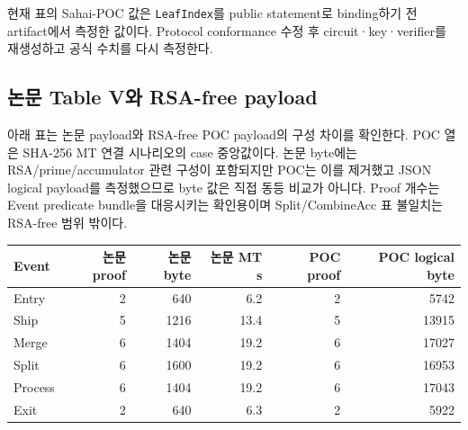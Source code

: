 \documentclass[10pt]{article}
\begin{document}
현재 표의 Sahai-POC 값은 \texttt{LeafIndex}를 public statement로 binding하기 전 artifact에서 측정한 값이다. Protocol conformance 수정 후 circuit·key·verifier를 재생성하고 공식 수치를 다시 측정한다.

\newpage
\subsection{논문 Table V와 RSA-free payload}
아래 표는 논문 payload와 RSA-free POC payload의 구성 차이를 확인한다. POC 열은 SHA-256 MT 연결 시나리오의 case 중앙값이다. 논문 byte에는 RSA/prime/accumulator 관련 구성이 포함되지만 POC는 이를 제거했고 JSON logical payload를 측정했으므로 byte 값은 직접 동등 비교가 아니다. Proof 개수는 Event predicate bundle을 대응시키는 확인용이며 Split/CombineAcc 표 불일치는 RSA-free 범위 밖이다.
\begin{center}
\begin{tabular}{lrrrrr}
\toprule Event & 논문 proof & 논문 byte & 논문 MT s & POC proof & POC logical byte\\
\midrule
Entry & 2 & 640 & 6.2 & 2 & 5742\\
Ship & 5 & 1216 & 13.4 & 5 & 13915\\
Merge & 6 & 1404 & 19.2 & 6 & 17027\\
Split & 6 & 1600 & 19.2 & 6 & 16953\\
Process & 6 & 1404 & 19.2 & 6 & 17043\\
Exit & 2 & 640 & 6.3 & 2 & 5922\\
\bottomrule\end{tabular}
\end{center}
\end{document}
